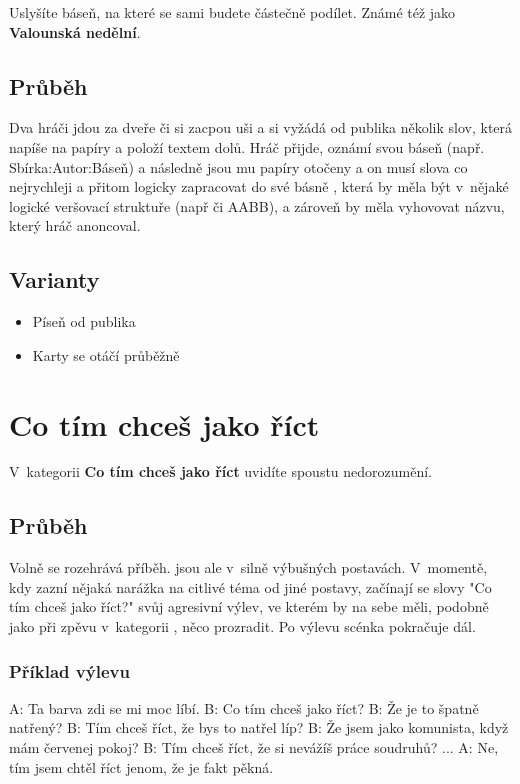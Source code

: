  
Uslyšíte báseň, na které se sami budete částečně podílet. 
Známé též jako \textbf{Valounská nedělní}. 
 
\subsection{Průběh} Dva hráči jdou za dveře či si zacpou uši a  si vyžádá od publika několik slov, která napíše na papíry a položí textem dolů. 
Hráč přijde, oznámí svou báseň (např. Sbírka:Autor:Báseň) a následně jsou mu papíry otočeny a on musí slova co nejrychleji a přitom logicky zapracovat do své básně , 
která by měla být v~nějaké logické veršovací struktuře (např  či AABB), a zároveň by měla vyhovovat názvu, který hráč anoncoval. 
 
 
\subsection{ Varianty } \begin{itemize}
\item Píseň od publika
\item Karty se otáčí průběžně
\end{itemize}
 
 
 
 
\needspace{5cm} \section{Co tím chceš jako říct} \label{co tím chceš jako říct}  
 
V~kategorii \textbf{Co tím chceš jako říct} uvidíte spoustu nedorozumění. 
 
 
\subsection{ Průběh } Volně se rozehrává příběh.  jsou ale v~silně výbušných postavách. V~momentě, kdy zazní nějaká narážka na citlivé téma od jiné postavy, začínají se slovy "Co tím chceš jako říct?"{} svůj agresivní výlev, ve kterém by na sebe měli, podobně jako při zpěvu v~kategorii , něco prozradit. Po výlevu scénka pokračuje dál. 
 
\subsubsection{ Příklad výlevu } A: Ta barva zdi se mi moc líbí. 
B: Co tím chceš jako říct? 
B: Že je to špatně natřený? 
B: Tím chceš říct, že bys to natřel líp? 
B: Že jsem jako komunista, když mám červenej pokoj? 
B: Tím chceš říct, že si nevážíš práce soudruhů? 
... 
A: Ne, tím jsem chtěl říct jenom, že je fakt pěkná. 
 
